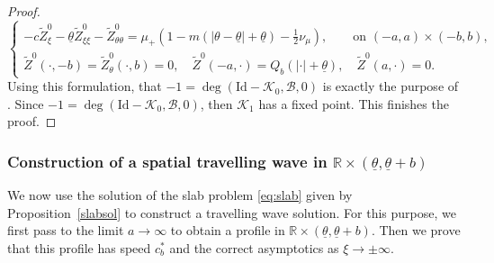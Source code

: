 \documentclass[11pt]{article}    %
\newcommand{\Id}{\mathrm{Id}}
\newcommand{\R}{\mathbb{R}}
\renewcommand{\epsilon}{\varepsilon}
\newcommand{\eps}{\varepsilon}
\begin{document}
\begin{proof}
\begin{equation*}
\begin{cases}
	-c \widetilde{Z}_\xi ^0 - \underline\theta \widetilde{Z}_{\xi\xi}^0  - \widetilde{Z}_{\theta\theta}^0 = \mu_+ (1 - m(|\theta-\underline\theta| + \underline\theta) - \frac12 \nu_\mu), \qquad \text{on }(-a,a)\times(-b,b), \\
	\widetilde{Z}^0(\cdot, - b) = \widetilde{Z}_\theta^0(\cdot,b) = 0,
	\quad \widetilde{Z}^0(-a,\cdot) = Q_b(\vert \cdot \vert + \underline\theta),
	\quad \widetilde{Z}^0(a,\cdot)  = 0.
\end{cases}
\end{equation*}
Using this formulation, that $-1 %
= \deg\left(  \Id - \mathcal{K}_{0} , \mathcal{B} , 0 \right)$ is exactly the purpose of \cite[Proposition 3.9]{AlfaroCovilleRaoul}. %
Since $ -1 = \deg(\Id - \mathcal{K}_0, \mathcal{B},0)$, then $\mathcal{K}_1$ has a fixed point.  This finishes the proof.%
\end{proof}







\subsubsection{Construction of a spatial travelling wave in $\R\times (\underline\theta,\underline\theta + b)$}

We now use the solution of the slab problem \eqref{eq:slab} given by Proposition~\ref{slabsol} to construct a travelling wave solution. For this purpose, we first pass to the limit $a \to \infty$ to obtain a profile in $\R\times(\underline\theta,\underline\theta+b)$. Then we prove that this profile has speed $c_b^*$ and the correct asymptotics as $\xi \to \pm\infty$.
\end{document}
